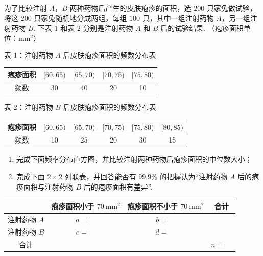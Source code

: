 \begin{problem}
为了比较注射 \(A\)，\(B\) 两种药物后产生的皮肤疱疹的面积，选 \(200\) 只家兔做试验，将这 \(200\) 只家兔随机地分成两组，每组 \(100\) 只，其中一组注射药物 \(A\)，另一组注射药物 \(B\). 下表 \(1\) 和表 \(2\) 分别是注射药物 \(A\) 和 \(B\) 后的试验结果. （疱疹面积单位：\(\mathrm{mm}^2\)）

\begin{center}
表 1：注射药物 \(A\) 后皮肤疱疹面积的频数分布表

\begin{tabular}{|c|c|c|c|c|}
\hline
疱疹面积 & \([60,65)\) & \([65,70)\) & \([70,75)\) & \([75,80)\) \\
\hline
频数 & 30 & 40 & 20 & 10 \\
\hline
\end{tabular}
\end{center}

\begin{center}
表 2：注射药物 \(B\) 后皮肤疱疹面积的频数分布表

\begin{tabular}{|c|c|c|c|c|c|}
\hline
疱疹面积 & \([60,65)\) & \([65,70)\) & \([70,75)\) & \([75,80)\) & \([80,85)\) \\
\hline
频数 & 10 & 25 & 20 & 30 & 15 \\
\hline
\end{tabular}
\end{center}

\begin{enumerate}
\item 完成下面频率分布直方图，并比较注射两种药物后疱疹面积的中位数大小；

\item 完成下面 \(2\times2\) 列联表，并回答能否有 \(99.9\%\) 的把握认为“注射药物 \(A\) 后的疱疹面积与注射药物 \(B\) 后的疱疹面积有差异”.
\end{enumerate}


\begin{center}
\begin{tabular}{|c|c|c|c|}
\hline
 & 疱疹面积小于 \(70\mathrm{~mm}^2\) & 疱疹面积不小于 \(70\mathrm{~mm}^2\) & 合计 \\
\hline
注射药物 \(A\) & \(a=\quad\) & \(b=\quad\) &  \\
\hline
注射药物 \(B\) & \(c=\quad\) & \(d=\quad\) &  \\
\hline
合计 &  &  & \(n=\quad\) \\
\hline
\end{tabular}
\end{center}


\end{problem}
